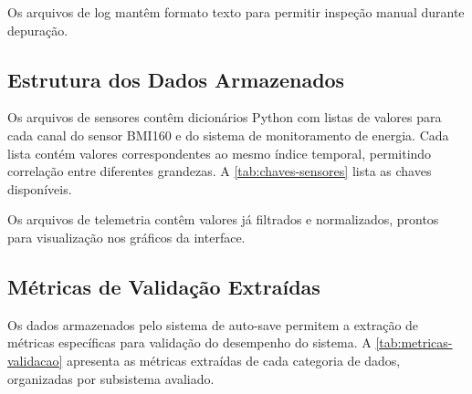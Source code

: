 Os arquivos de log mantêm formato texto para permitir inspeção manual durante depuração.

\subsection{Estrutura dos Dados Armazenados}
\label{subsec:estrutura-dados-armazenados}

Os arquivos de sensores contêm dicionários Python com listas de valores para cada canal do sensor BMI160 e do sistema de monitoramento de energia. Cada lista contém valores correspondentes ao mesmo índice temporal, permitindo correlação entre diferentes grandezas. A \autoref{tab:chaves-sensores} lista as chaves disponíveis.

\begin{table}[!h]
\captionsetup{width=16cm}
\end{table}

\noindent Os arquivos de telemetria contêm valores já filtrados e normalizados, prontos para visualização nos gráficos da interface.

\subsection{Métricas de Validação Extraídas}
\label{subsec:metricas-validacao}

Os dados armazenados pelo sistema de auto-save permitem a extração de métricas específicas para validação do desempenho do sistema. A \autoref{tab:metricas-validacao} apresenta as métricas extraídas de cada categoria de dados, organizadas por subsistema avaliado.

